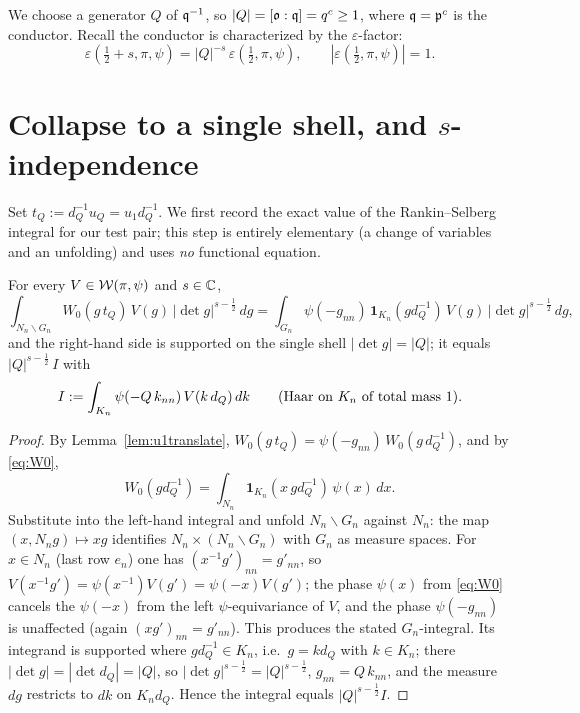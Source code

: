 We choose a generator $Q$ of $\mathfrak{q}^{-1}$, so $|Q|=[\mathfrak{o}:\mathfrak{q}]=q^{c}\ge1$, where
$\mathfrak{q}=\mathfrak{p}^{c}$ is the conductor. Recall the
conductor is characterized by the $\varepsilon$-factor:
\begin{equation}\label{eq:eps}
\varepsilon(\tfrac12+s,\pi,\psi)=|Q|^{-s}\,\varepsilon(\tfrac12,\pi,\psi),
\qquad |\varepsilon(\tfrac12,\pi,\psi)|=1 .
\end{equation}


\section*{Collapse to a single shell, and $s$-independence}

Set $t_Q:=d_Q^{-1}u_Q=u_1 d_Q^{-1}$. We first record the exact value of the
Rankin--Selberg integral for our test pair; this step is entirely elementary
\textup{(}a change of variables and an unfolding\textup{)} and uses \emph{no} functional
equation.

\begin{qtwolemma}\label{lem:unfold}
For every $V\in\mathcal{W}(\pi,\psi)$ and $s\in\mathbb{C}$,
\[
\int_{N_n\backslash G_n} W_0(g\,t_Q)\,V(g)\,|\det g|^{s-\frac12}\,dg
=\int_{G_n}\psi(-g_{nn})\,\mathbf 1_{K_n}(g d_Q^{-1})\,V(g)\,|\det g|^{s-\frac12}\,dg ,
\]
and the right-hand side is supported on the single shell $|\det g|=|Q|$; it equals
$|Q|^{s-\frac12}\,I$ with
\begin{equation}\label{eq:Idef}
I:=\int_{K_n}\psi(-Q\,k_{nn})\,V(k\,d_Q)\,dk\qquad\textup{(Haar on $K_n$ of total mass $1$).}
\end{equation}
\end{qtwolemma}

\begin{proof}
By Lemma~\ref{lem:u1translate}, $W_0(g\,t_Q)=\psi(-g_{nn})\,W_0(g\,d_Q^{-1})$, and by
\eqref{eq:W0},
\[
W_0(g d_Q^{-1})=\int_{N_n}\mathbf 1_{K_n}(x\,g d_Q^{-1})\,\psi(x)\,dx .
\]
Substitute into the left-hand integral and unfold $N_n\backslash G_n$ against $N_n$: the map
$(x,N_n g)\mapsto xg$ identifies $N_n\times(N_n\backslash G_n)$ with $G_n$ as measure spaces.
For $x\in N_n$ \textup{(}last row $e_n$\textup{)} one has $(x^{-1}g')_{nn}=g'_{nn}$, so
$V(x^{-1}g')=\psi(x^{-1})V(g')=\psi(-x)V(g')$; the phase $\psi(x)$ from \eqref{eq:W0} cancels the
$\psi(-x)$ from the left $\psi$-equivariance of $V$, and the phase $\psi(-g_{nn})$ is unaffected
\textup{(}again $(xg')_{nn}=g'_{nn}$\textup{)}. This produces the stated $G_n$-integral. Its
integrand is supported where $g d_Q^{-1}\in K_n$, i.e.\ $g=k d_Q$ with $k\in K_n$; there
$|\det g|=|\det d_Q|=|Q|$, so $|\det g|^{s-\frac12}=|Q|^{s-\frac12}$, $g_{nn}=Q\,k_{nn}$, and the
measure $dg$ restricts to $dk$ on $K_n d_Q$. Hence the integral equals $|Q|^{s-\frac12}I$.
\end{proof}

